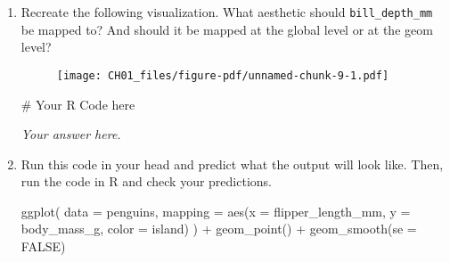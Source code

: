 \documentclass[
  letterpaper,
  DIV=11,
  numbers=noendperiod]{scrreprt}
\newenvironment{Shaded}{\begin{snugshade}}{\end{snugshade}}
\newcommand{\AttributeTok}[1]{\textcolor[rgb]{0.40,0.45,0.13}{#1}}
\newcommand{\CommentTok}[1]{\textcolor[rgb]{0.37,0.37,0.37}{#1}}
\newcommand{\ConstantTok}[1]{\textcolor[rgb]{0.56,0.35,0.01}{#1}}
\newcommand{\FunctionTok}[1]{\textcolor[rgb]{0.28,0.35,0.67}{#1}}
\newcommand{\NormalTok}[1]{\textcolor[rgb]{0.00,0.23,0.31}{#1}}
\newcommand{\SpecialCharTok}[1]{\textcolor[rgb]{0.37,0.37,0.37}{#1}}
\begin{document}
\begin{enumerate}
\begin{tcolorbox}
  \end{tcolorbox}
\item
  Recreate the following visualization. What aesthetic should
  \texttt{bill\_depth\_mm} be mapped to? And should it be mapped at the
  global level or at the geom level?

  \begin{figure}

  {\centering \texttt{[image: CH01\_files/figure-pdf/unnamed-chunk-9-1.pdf]}

  }

  \end{figure}

  \begin{tcolorbox}[enhanced jigsaw, breakable, bottomtitle=1mm, left=2mm, colback=white, toprule=.15mm, leftrule=.75mm, colframe=quarto-callout-note-color-frame, colbacktitle=quarto-callout-note-color!10!white, title={Answer}, coltitle=black, toptitle=1mm, bottomrule=.15mm, opacitybacktitle=0.6, arc=.35mm, rightrule=.15mm, titlerule=0mm, opacityback=0]

\begin{Shaded}
\begin{Highlighting}[]
\CommentTok{\# Your R Code here}
\end{Highlighting}
\end{Shaded}

  \emph{Your answer here.}

  \end{tcolorbox}
\item
  Run this code in your head and predict what the output will look like.
  Then, run the code in R and check your predictions.

\begin{Shaded}
\begin{Highlighting}[]
\FunctionTok{ggplot}\NormalTok{(}
  \AttributeTok{data =}\NormalTok{ penguins,}
  \AttributeTok{mapping =} \FunctionTok{aes}\NormalTok{(}\AttributeTok{x =}\NormalTok{ flipper\_length\_mm, }\AttributeTok{y =}\NormalTok{ body\_mass\_g, }\AttributeTok{color =}\NormalTok{ island)}
\NormalTok{) }\SpecialCharTok{+}
    \FunctionTok{geom\_point}\NormalTok{() }\SpecialCharTok{+}
    \FunctionTok{geom\_smooth}\NormalTok{(}\AttributeTok{se =} \ConstantTok{FALSE}\NormalTok{)}
\end{Highlighting}
\end{Shaded}

  \begin{tcolorbox}[enhanced jigsaw, breakable, bottomtitle=1mm, left=2mm, colback=white, toprule=.15mm, leftrule=.75mm, colframe=quarto-callout-note-color-frame, colbacktitle=quarto-callout-note-color!10!white, title={Answer}, coltitle=black, toptitle=1mm, bottomrule=.15mm, opacitybacktitle=0.6, arc=.35mm, rightrule=.15mm, titlerule=0mm, opacityback=0]


\end{tcolorbox}
\end{enumerate}
\end{document}
